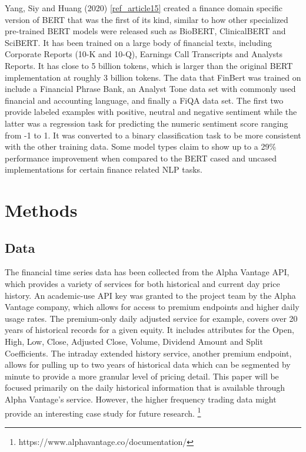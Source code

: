 \documentclass{llncs}
\begin{document}
Yang, Siy and Huang (2020) \ref{ref_article15} created a finance domain specific version of BERT that was the first of its kind, similar to how other specialized pre-trained BERT models were released such as BioBERT, ClinicalBERT and SciBERT.  It has been trained on a large body of financial texts, including Corporate Reports (10-K  and 10-Q), Earnings Call Transcripts and Analysts Reports.  It has close to 5 billion tokens, which is larger than the original BERT implementation at roughly 3 billion tokens.  The data that FinBert was trained on include a Financial Phrase Bank, an Analyst Tone data set with commonly used financial and accounting language, and finally a FiQA data set.  The first two provide labeled examples with positive, neutral and negative sentiment while the latter was a regression task for predicting the numeric sentiment score ranging from -1 to 1.  It was converted to a binary classification task to be more consistent with the other training data.  Some model types claim to show up to a 29\% performance improvement when compared to the BERT cased and uncased implementations for certain finance related NLP tasks.  

\section{Methods}

\subsection{Data}

The financial time series data has been collected from the Alpha Vantage API, which provides a variety of services for both historical and current day price history.  An academic-use API key was granted to the project team by the Alpha Vantage company, which allows for access to premium endpoints and higher daily usage rates. The premium-only daily adjusted service for example, covers over 20 years of historical records for a given equity.  It includes attributes for the Open, High, Low, Close, Adjusted Close, Volume, Dividend Amount and Split Coefficients.  The intraday extended history service, another premium endpoint,  allows for pulling up to two years of historical data which can be segmented by minute to provide a more granular level of pricing detail.  This paper will be focused primarily on the daily historical information that is available through Alpha Vantage's service.  However, the higher frequency trading data might provide an interesting case study for future research.
\footnote{https://www.alphavantage.co/documentation/}
\end{document}
